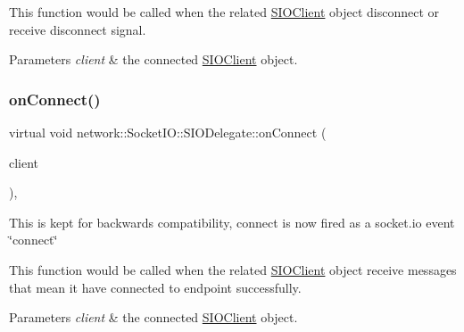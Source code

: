 This function would be called when the related \hyperlink{classnetwork_1_1SIOClient}{S\+I\+O\+Client} object disconnect or receive disconnect signal.


\begin{DoxyParams}{Parameters}
{\em client} & the connected \hyperlink{classnetwork_1_1SIOClient}{S\+I\+O\+Client} object. \\
\hline
\end{DoxyParams}
\mbox{\label{classnetwork_1_1SocketIO_1_1SIODelegate_a98b6cc717fbfb99d96216ddf5824b2ab}} 
\subsubsection{\texorpdfstring{on\+Connect()}{onConnect()}\hspace{0.1cm}{\footnotesize\ttfamily [1/2]}}
{\footnotesize\ttfamily virtual void network\+::\+Socket\+I\+O\+::\+S\+I\+O\+Delegate\+::on\+Connect (\begin{DoxyParamCaption}\item[{\hyperlink{classnetwork_1_1SIOClient}{S\+I\+O\+Client} $\ast$}]{client }\end{DoxyParamCaption})\hspace{0.3cm}{\ttfamily [inline]}, {\ttfamily [virtual]}}

This is kept for backwards compatibility, connect is now fired as a socket.\+io event \char`\"{}connect\char`\"{}

This function would be called when the related \hyperlink{classnetwork_1_1SIOClient}{S\+I\+O\+Client} object receive messages that mean it have connected to endpoint successfully.


\begin{DoxyParams}{Parameters}
{\em client} & the connected \hyperlink{classnetwork_1_1SIOClient}{S\+I\+O\+Client} object. \\
\hline
\end{DoxyParams}
\mbox{\label{classnetwork_1_1SocketIO_1_1SIODelegate_a98b6cc717fbfb99d96216ddf5824b2ab}} 
